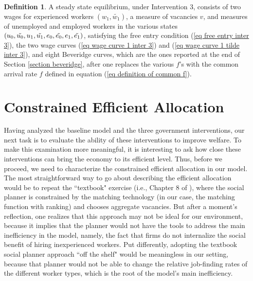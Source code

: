 \documentclass[12pt]{article} %
\theoremstyle{definition}
\newtheorem{definition}{Definition}%
\begin{document}
\begin{definition}\label{definition equil inter 3}
A steady state equilibrium, under Intervention 3, consists of two wages for experienced workers $(w_1, \tilde{w_1})$, a measure of vacancies $v$, and measures of unemployed and employed workers in the various states $(u_0, \Tilde{u_0}, u_1, \Tilde{u_1}, e_0, \Tilde{e_0}, e_1, \Tilde{e_1})$, satisfying the free entry condition (\ref{eq free entry inter 3}), the two wage curves (\ref{eq wage curve 1 inter 3}) and (\ref{eq wage curve 1 tilde inter 3}), and eight Beveridge curves, which are the ones reported at the end of Section \ref{section beveridge}, after one replaces the various $f$'s with the common arrival rate $f$ defined in equation (\ref{eq definition of common f}). 
\end{definition} 


\iffalse

\section{Constrained Efficient Allocation}\label{section planner} 

Having analyzed the baseline model and the three government interventions, our next task is to evaluate the ability of these interventions to improve welfare. To make this examination more meaningful, it is interesting to ask how close these interventions can bring the economy to its efficient level. Thus, before we proceed, we need to characterize the constrained efficient allocation in our model. The most straightforward way to go about describing the efficient allocation would be to repeat the ``textbook" exercise (i.e., Chapter 8 of \citealt{pissarides2000equilibrium}), where the social planner is constrained by the matching technology (in our case, the \citealt{petrongolo2001looking} matching function with ranking) and chooses aggregate vacancies. But after a moment's reflection, one realizes that this approach may not be ideal for our environment, because it implies that the planner would not have the tools to address the main inefficiency in the model, namely, the fact that firms do not internalize the social benefit of hiring inexperienced workers.
Put differently, adopting the textbook social planner approach ``off the shelf" would be meaningless in our setting, because that planner would not be able to change the relative job-finding rates of the different worker types, which is the root of the model's main inefficiency. 
\end{document}
